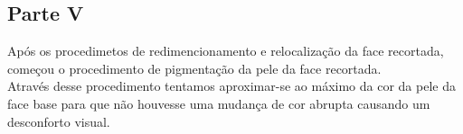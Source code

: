 \documentclass[journal]{IEEEtran}
\begin{document}
\begin{figure}[h]
\centering
{}
\end{figure}



\subsection{Parte V}

Após os procedimetos de redimencionamento e relocalização da face recortada, começou o procedimento de pigmentação da pele da face recortada.\\
Através desse procedimento tentamos aproximar-se ao máximo da cor da pele da face base para que não houvesse uma mudança de cor abrupta causando um desconforto visual. 
\end{document}
